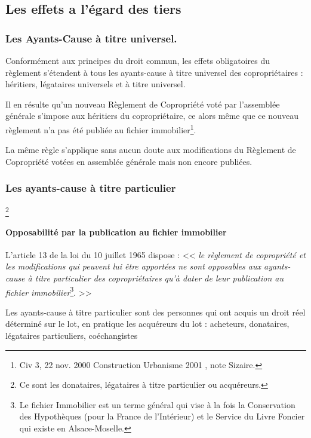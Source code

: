 	\subsection{Les effets a l'égard des tiers}
	
		\subsubsection{Les Ayants-Cause à titre universel.}
		
			Conformément aux principes du droit commun, les effets obligatoires du règlement s'étendent à tous les ayants-cause à titre universel des copropriétaires : héritiers, légataires universels et à titre universel.
			
			Il en résulte qu’un nouveau Règlement de Copropriété voté par l’assemblée générale s’impose aux héritiers du copropriétaire, ce alors même que ce nouveau règlement n’a pas été publiée au fichier immobilier\footnote{Civ 3\degres, 22 nov. 2000 Construction Urbanisme 2001 , note Sizaire.}.
			
			La même règle s’applique sans aucun doute aux modifications du Règlement de Copropriété votées en assemblée générale mais non encore publiées.
		
		\subsubsection{Les ayants-cause à titre particulier}\footnote{Ce sont les donataires, légataires à titre particulier ou acquéreurs.} 
		
			\paragraph{Opposabilité par la publication au fichier immobilier}
			
			L'article 13 de la loi du 10 juillet 1965 dispose :
			<< {\itshape le règlement de copropriété et les modifications qui peuvent lui être apportées ne sont opposables aux ayants-cause à titre particulier des copropriétaires qu'à dater de leur publication au fichier immobilier}\footnote{Le fichier Immobilier est un terme général qui vise à la fois la Conservation des Hypothèques (pour la France de l’Intérieur) et le Service du Livre Foncier qui existe en Alsace-Moselle.}. >>
			
			Les ayants-cause à titre particulier sont des personnes qui ont acquis un droit réel déterminé sur le lot, en pratique les acquéreurs du lot : acheteurs, donataires, légataires particuliers, coéchangistes \etc
			
